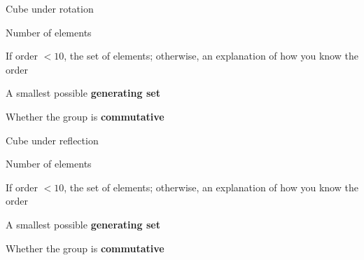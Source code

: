 \documentclass[../gatm_answers.tex]{subfiles}
\begin{document}
\begin{outer_problem}
\item Cube under rotation
\end{outer_problem}

\begin{inner_problem}[start=1]
\item Number of elements
\end{inner_problem}

\begin{inner_problem}
\item If order $< 10$, the set of elements; otherwise, an explanation of how you know the order
\end{inner_problem}

\begin{inner_problem}
\item A smallest possible \textbf{generating set}
\end{inner_problem}

\begin{inner_problem}
\item Whether the group is \textbf{commutative}
\end{inner_problem}

\begin{outer_problem}
\item Cube under reflection
\end{outer_problem}

\begin{inner_problem}[start=1]
\item Number of elements
\end{inner_problem}

\begin{inner_problem}
\item If order $< 10$, the set of elements; otherwise, an explanation of how you know the order
\end{inner_problem}

\begin{inner_problem}
\item A smallest possible \textbf{generating set}
\end{inner_problem}

\begin{inner_problem}
\item Whether the group is \textbf{commutative}
\end{inner_problem}
\end{document}
